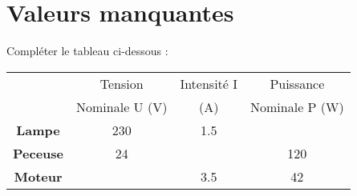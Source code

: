 \section{Valeurs manquantes}

\begin{questions}
	\question Compléter le tableau ci-dessous :


\begin{center}
	{\large \begin{tabular}{|@{\ }c@{\ }|@{\ }c@{\ }|@{\ }c@{\ }|@{\ }c@{\ }|}
	\hline
	& Tension        & Intensité I & Puissance      \\ 
	& Nominale U (V) & (A)         & Nominale P (W) \\ \hline
	\textbf{Lampe}   & 230            & \num{1.5}   &                \\ \hline
	\textbf{Peceuse} & 24             &             & 120            \\ \hline
	\textbf{Moteur}  &                & \num{3.5}   & 42             \\ \hline
\end{tabular}}
\end{center}

\end{questions}